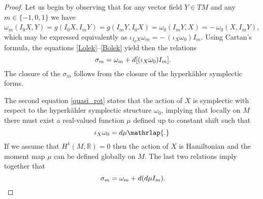 \documentclass[11pt]{amsart}
\theoremstyle{remark}
\theoremstyle{remark}
\theoremstyle{definition}
\theoremstyle{definition}
\theoremstyle{definition}
\newcommand{\0}{{\scriptstyle 0'}} %
\newcommand{\1}{{\scriptstyle 1'}}
\begin{document}
\begin{proof}


Let us begin by observing that for any vector field $Y \in TM$ and any $m \in \{-1,0,1\}$ we have $\omega_m(I_0X,Y) = g(I_0X,I_mY) = g(I_mY,I_0X) = \omega_0(I_mY,X) = - \, \omega_0(X,I_mY)$, which may be expressed equivalently as $\iota_{I_0X}\omega_m = -\, (\iota_X\omega_0) I_m$. Using Cartan's formula, the equations \eqref{Lolek}--\eqref{Bolek} yield then the relations
\begin{equation} \label{[sgm]=[omg]}
\sigma_m = \omega_m  + d[(\iota_X\omega_0) I_m] \rlap{.}
\end{equation}
The closure of the $\sigma_m$ follows from the closure of the hyperk\"ahler symplectic forms.

The second equation \eqref{quasi_rot} states that the action of $X$ is symplectic with respect to the hyperk\"ahler symplectic structure $\omega_0$, implying that locally on $M$ there must exist a real-valued function $\mu$ defined up to constant shift such that
\begin{equation} \label{mom_map_3}
\iota_X\omega_0 = d\mu \mathrlap{.}
\end{equation}
If we assume that $H^1(M,\mathbb{R}) = 0$ then the action of $X$ is Hamiltonian and the moment map $\mu$ can be defined globally on $M$. The last two relations imply together that
\begin{equation} \label{sgm-omg}
\sigma_m = \omega_m  + d(d\mu I_m) \rlap{.}
\end{equation}


\end{proof}
\end{document}
